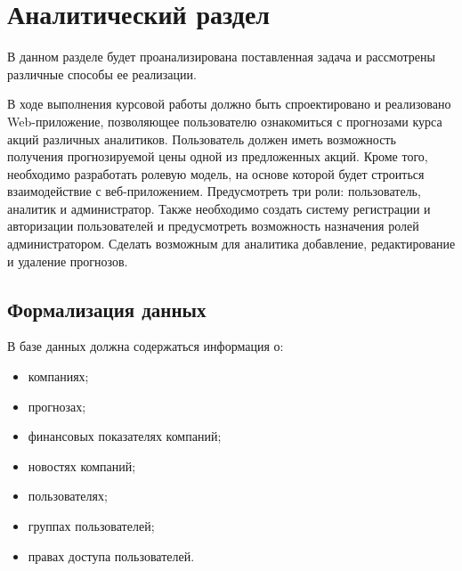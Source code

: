 \chapter{Аналитический раздел}

В данном разделе будет проанализирована поставленная задача и рассмотрены различные способы ее реализации.

В ходе выполнения курсовой работы должно быть спроектировано и реализовано Web-приложение, позволяющее пользователю ознакомиться с прогнозами курса акций различных аналитиков. Пользователь должен иметь возможность получения прогнозируемой цены одной из предложенных акций. 
Кроме того, необходимо разработать ролевую модель, на основе которой будет строиться взаимодействие с веб-приложением. Предусмотреть три роли: пользователь, аналитик и администратор. Также необходимо создать систему регистрации и авторизации пользователей и предусмотреть возможность назначения ролей администратором. Сделать возможным для аналитика добавление, редактирование и удаление прогнозов.


\section{Формализация данных} 
В базе данных должна содержаться информация о:
\begin{itemize}
	\item компаниях;
 	\item прогнозах;
  \item финансовых показателях компаний;
  \item новостях компаний;
  \item пользователях;
  \item группах пользователей;
  \item правах доступа пользователей.  
\end{itemize}


